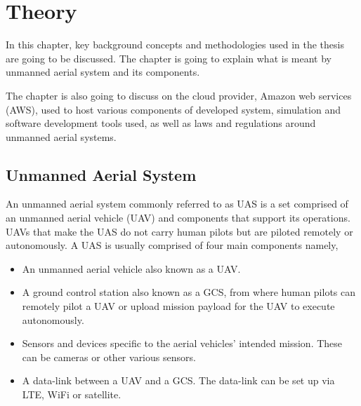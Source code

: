 


\chapter{Theory}
\label{chap:theory}

In this chapter, key background concepts and methodologies used in the thesis are going to be discussed. The chapter is going to explain what is meant by unmanned aerial system and its components.

The chapter is also going to discuss on the cloud provider, Amazon web services (AWS), used to host various components of developed system, simulation and software development tools used, as well as laws and regulations around unmanned aerial systems.



\section{Unmanned Aerial System}
\label{sec:unmanned-aerial-system}

An unmanned aerial system commonly referred to as UAS is a set comprised of an unmanned aerial vehicle (UAV) and components that support its operations. UAVs that make the UAS do not carry human pilots but are piloted remotely or autonomously. A UAS is usually comprised of four main components namely,

\begin{itemize}
    \item An unmanned aerial vehicle also known as a UAV.
    \item A ground control station also known as a GCS, from where human pilots can remotely pilot a UAV or upload mission payload for the UAV to execute autonomously.
    \item Sensors and devices specific to the aerial vehicles' intended mission. These can be cameras or other various sensors.
    \item A data-link between a UAV and a GCS. The data-link can be set up via LTE, WiFi or satellite.
\end{itemize}

